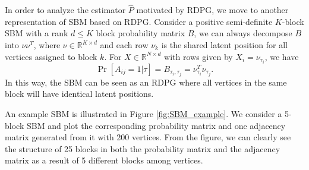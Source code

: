 \documentclass[a4paper]{article}
\begin{document}
In order to analyze the estimator $\hat{P}$ motivated by RDPG, we move to another representation of SBM based on RDPG. 
Consider a positive semi-definite $K$-block SBM with a rank $d\le K$ block probability matrix $B$, we can always decompose $B$ into $\nu \nu^T$, where $\nu \in \mathbb{R}^{K \times d}$ and each row $\nu_k$ is the shared latent position for all vertices assigned to block $k$. 
For $X \in \mathbb{R}^{N \times d}$ with rows given by $X_i = \nu_{\tau_i}$, we have
\[
	\Pr[A_{ij} = 1|\tau] = B_{\tau_i, \tau_j} = \nu_{\tau_i}^T \nu_{\tau_j}.
\]
In this way, the SBM can be seen as an RDPG where all vertices in the same block will have identical latent positions.

An example SBM is illustrated in Figure \ref{fig:SBM_example}.
We consider a 5-block SBM and plot the corresponding probability matrix and one adjacency matrix generated from it with 200 vertices. From the figure, we can clearly see the structure of 25 blocks in both the probability matrix and the adjacency matrix as a result of 5 different blocks among vertices.
\end{document}
